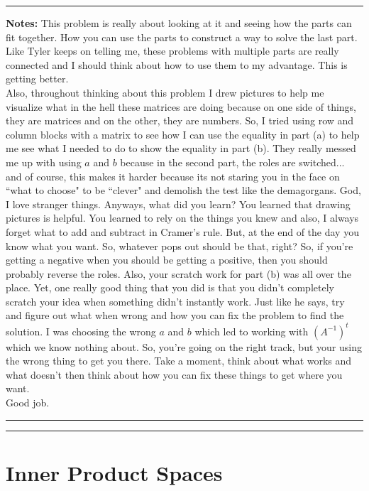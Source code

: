 \documentclass{article}
\begin{document}
\hrule 

\textbf{Notes:} This problem is really about looking at it and seeing how the parts can fit together. How you can use the parts to construct a way to solve the last part. Like Tyler keeps on telling me, these problems with multiple parts are really connected and I should think about how to use them to my advantage. This is getting better. \\

Also, throughout thinking about this problem I drew pictures to help me visualize what in the hell these matrices are doing because on one side of things, they are matrices and on the other, they are numbers. So, I tried using row and column blocks with a matrix to see how I can use the equality in part (a) to help me see what I needed to do to show the equality in part (b). They really messed me up with using $a$ and $b$ because in the second part, the roles are switched... and of course, this makes it harder because its not staring you in the face on ``what to choose" to be ``clever" and demolish the test like the demagorgans. God, I love stranger things. Anyways, what did you learn? You learned that drawing pictures is helpful. You learned to rely on the things you knew and also, I always forget what to add and subtract in Cramer's rule. But, at the end of the day you know what you want. So, whatever pops out should be that, right? So, if you're getting a negative when you should be getting a positive, then you should probably reverse the roles. Also, your scratch work for part (b) was all over the place. Yet, one really good thing that you did is that you didn't completely scratch your idea when something didn't instantly work. Just like he says, try and figure out what when wrong and how you can fix the problem to find the solution. I was choosing the wrong $a$ and $b$ which led to working with $(A^{-1})^t$ which we know nothing about. So, you're going on the right track, but your using the wrong thing to get you there. Take a moment, think about what works and what doesn't then think about how you can fix these things to get where you want.\\

Good job.\\

\hrule\vspace{2pt}
\hrule

\break

\section{Inner Product Spaces}
\end{document}
